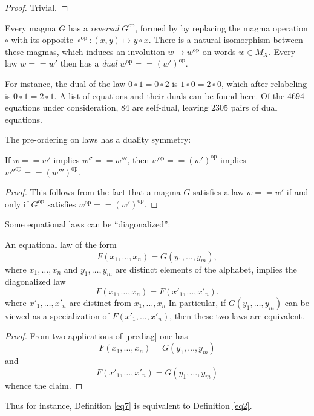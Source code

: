 \begin{proof} Trivial.
\end{proof}

Every magma $G$ has a \emph{reversal} $G^{\mathrm{op}}$, formed by by replacing the magma operation $\circ$ with its opposite $\circ^{\mathrm{op}}:(x,y) \mapsto y \circ x$. There is a natural isomorphism between these magmas, which induces an involution $w \mapsto w^{\mathrm{op}}$ on words $w \in M_X$.  Every law $w == w'$ then has a \emph{dual} $w^{\mathrm{op}} == (w')^{\mathrm{op}}$.

For instance, the dual of the law $0 \circ 1 = 0 \circ 2$ is $1 \circ 0 = 2 \circ 0$, which after relabeling is $0 \circ 1 = 2 \circ 1$.  A list of equations and their duals can be found \href{https://github.com/teorth/equational_theories/blob/main/data/dual_equations.md}{here}.  Of the 4694 equations under consideration, 84 are self-dual, leaving 2305 pairs of dual equations.

The pre-ordering on laws has a duality symmetry:

\begin{lemma}\label{duality}  If $w == w'$ implies $w'' == w'''$, then $w^{\mathrm{op}} == (w')^{\mathrm{op}}$ implies $w''^{\mathrm{op}} == (w''')^{\mathrm{op}}$.
\end{lemma}

\begin{proof} This follows from the fact that a magma $G$ satisfies a law $w == w'$ if and only if $G^{\mathrm{op}}$ satisfies $w^{\mathrm{op}} == (w')^{\mathrm{op}}$.
\end{proof}

Some equational laws can be ``diagonalized'':

\begin{theorem}[Diagonalization]\label{diag}  An equational law of the form
  \begin{equation}\label{prediag} F(x_1,\dots,x_n) = G(y_1,\dots,y_m),
  \end{equation}
  where $x_1,\dots,x_n$ and $y_1,\dots,y_m$ are distinct elements of the alphabet, implies the diagonalized law
$$ F(x_1,\dots,x_n) = F(x'_1,\dots,x'_n).$$
where $x'_1,\dots,x'_n$ are distinct from $x_1,\dots,x_n$
In particular, if $G(y_1,\dots,y_m)$ can be viewed as a specialization of $F(x'_1,\dots,x'_n)$, then these two laws are equivalent.
\end{theorem}

\begin{proof}  From two applications of \eqref{prediag} one has
$$ F(x_1,\dots,x_n) = G(y_1,\dots,y_m)$$
and
$$ F(x'_1,\dots,x'_n) = G(y_1,\dots,y_m)$$
whence the claim.
\end{proof}

Thus for instance, Definition \ref{eq7} is equivalent to Definition \ref{eq2}.

